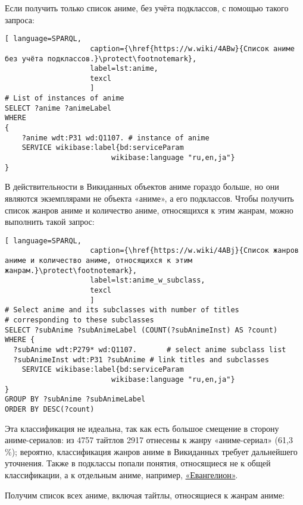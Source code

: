 Если получить только список аниме, без учёта подклассов, с помощью такого запроса:

\begin{lstlisting}[ language=SPARQL, 
                    caption={\href{https://w.wiki/4ABw}{Список аниме без учёта подклассов.}\protect\footnotemark},
                    label=lst:anime,
                    texcl 
                    ]
# List of instances of anime
SELECT ?anime ?animeLabel
WHERE
{
    ?anime wdt:P31 wd:Q1107. # instance of anime
    SERVICE wikibase:label{bd:serviceParam
					     wikibase:language "ru,en,ja"}
}
\end{lstlisting}%

В действительности в Викиданных объектов аниме гораздо больше, но они являются экземплярами не объекта «аниме», а его подклассов. Чтобы получить список жанров аниме и количество аниме, относящихся к этим жанрам, можно выполнить такой запрос:

\begin{lstlisting}[ language=SPARQL, 
                    caption={\href{https://w.wiki/4ABj}{Список жанров аниме и количество аниме, относящихся к этим жанрам.}\protect\footnotemark},
                    label=lst:anime_w_subclass,
                    texcl 
                    ]
# Select anime and its subclasses with number of titles
# corresponding to these subclasses
SELECT ?subAnime ?subAnimeLabel (COUNT(?subAnimeInst) AS ?count)
WHERE {
  ?subAnime wdt:P279* wd:Q1107.       # select anime subclass list
  ?subAnimeInst wdt:P31 ?subAnime # link titles and subclasses
    SERVICE wikibase:label{bd:serviceParam
					     wikibase:language "ru,en,ja"}
}
GROUP BY ?subAnime ?subAnimeLabel
ORDER BY DESC(?count)
\end{lstlisting}%

Эта классификация не идеальна, так как есть большое смещение в сторону аниме-сериалов: из 4757 тайтлов 2917 отнесены к жанру «аниме-сериал» (61,3 \%); вероятно, классификация жанров аниме в Викиданных требует дальнейшего уточнения. Также в подклассы попали понятия, относящиеся не к общей классификации, а к отдельным аниме, например, \href{https://clck.ru/9cFfS}{«Евангелион»}.

Получим список всех аниме, включая тайтлы, относящиеся к жанрам аниме:

